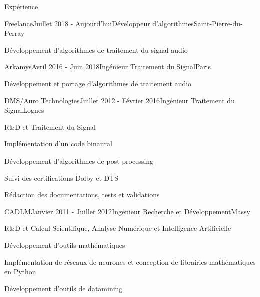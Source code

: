 \documentclass{resume} %
\begin{document}

\begin{rSection}{Expérience}

\begin{rSubsection}{Freelance}{Juillet 2018 - Aujourd'hui}{Développeur d'algorithmes}{Saint-Pierre-du-Perray}
\item Développement d'algorithmes de traitement du signal audio
\end{rSubsection}


\begin{rSubsection}{Arkamys}{Avril 2016 - Juin 2018}{Ingénieur Traitement du Signal}{Paris}
\item Développement et portage d'algorithmes de traitement audio
\end{rSubsection}


\begin{rSubsection}{DMS/Auro Technologies}{Juillet 2012 - Février 2016}{Ingénieur Traitement du Signal}{Lognes}
\item R\&D et Traitement du Signal
\item Implémentation d'un code binaural
\item Développement d'algorithmes de post-processing
\item Suivi des certifications Dolby et DTS
\item Rédaction des documentations, tests et validations
\end{rSubsection}


\begin{rSubsection}{CADLM}{Janvier 2011 - Juillet 2012}{Ingénieur Recherche et Développement}{Massy}
\item R\&D et Calcul Scientifique, Analyse Numérique et Intelligence Artificielle
\item Développement d'outils mathématiques
\item Implémentation de réseaux de neurones et conception de librairies mathématiques en Python
\item Développement d'outils de datamining
\end{rSubsection}


\end{rSection}
\end{document}
